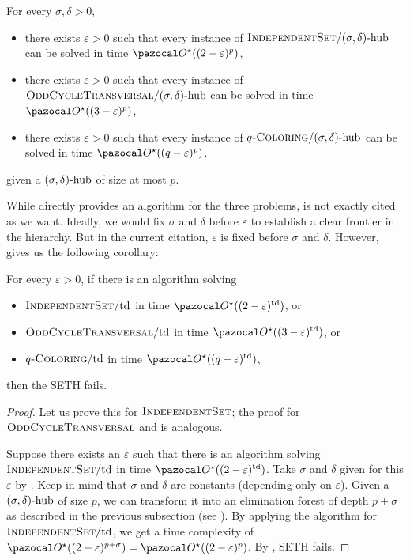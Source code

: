 \begin{theorem}
    \label{theorem:sdhub-upperbounds}
    For every $\sigma, \delta > 0$, 
    \begin{itemize}
        \item there exists $\varepsilon > 0$ such that every instance of $\textsc{IndependentSet}/(\sigma, \delta)\text{-hub}$ can be solved in time $\O^\star((2 - \varepsilon)^p)$,
        \item there exists $\varepsilon > 0$ such that every instance of $\textsc{OddCycleTransversal}/(\sigma, \delta)\text{-hub}$ can be solved in time $\O^\star((3 - \varepsilon)^p)$,
        \item there exists $\varepsilon > 0$ such that every instance of $q\textsc{-Coloring}/(\sigma, \delta)\text{-hub}$ can be solved in time $\O^\star((q - \varepsilon)^p)$.
    \end{itemize}
    given a $(\sigma, \delta)\text{-hub}$ of size at most $p$.
\end{theorem}

While  directly provides an algorithm for the three problems,  is not exactly cited as we want. Ideally, we would fix $\sigma$ and $\delta$ before $\varepsilon$ to establish a clear frontier in the hierarchy. But in the current citation, $\varepsilon$ is fixed before $\sigma$ and $\delta$. However,  gives us the following corollary:

\begin{corollary}
    \label{corollary:td-lowerbounds}
    For every $\varepsilon > 0$, if there is an algorithm solving
    \begin{itemize}
        \item $\textsc{IndependentSet}/\text{td}$ in time $\O^\star((2 - \varepsilon)^\td)$, or
        \item $\textsc{OddCycleTransversal}/\text{td}$ in time $\O^\star((3 - \varepsilon)^\td)$, or
        \item $q\textsc{-Coloring}/\text{td}$ in time $\O^\star((q - \varepsilon)^\td)$,
    \end{itemize}
    then the SETH fails.
\end{corollary}

\begin{proof}
    Let us prove this for $\textsc{IndependentSet}$; the proof for $\textsc{OddCycleTransversal}$ and  is analogous.

    Suppose there exists an $\varepsilon$ such that there is an algorithm solving $\textsc{IndependentSet}/\text{td}$ in time $\O^\star((2 - \varepsilon)^\td)$. Take $\sigma$ and $\delta$ given for this $\varepsilon$ by . Keep in mind that $\sigma$ and $\delta$ are constants (depending only on $\varepsilon$). Given a $(\sigma, \delta)\text{-hub}$ of size $p$, we can transform it into an elimination forest of depth $p + \sigma$ as described in the previous subsection (see ). By applying the algorithm for $\textsc{IndependentSet}/\text{td}$, we get a time complexity of $\O^\star((2 - \varepsilon)^{p + \sigma}) = \O^\star((2 - \varepsilon)^p)$. By , SETH fails.
\end{proof}

